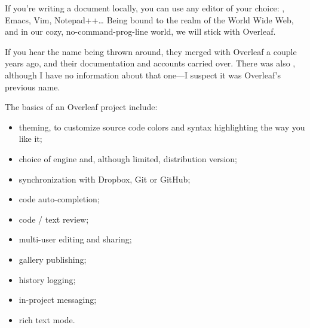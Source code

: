 If you're writing a document locally, you can use any editor of your choice: , Emacs, Vim, Notepad++\ldots{} Being bound to the realm of the World Wide Web, and in our cozy, no-\gls{command-prog}-line world, we will stick with Overleaf.

If you hear the name  being thrown around, they merged with Overleaf a couple years ago, and their documentation and accounts carried over. There was also , although I have no information about that one---I suspect it was Overleaf's previous name.

\noindent The basics of an Overleaf project include:
\begin{itemize}
    \item theming, to customize source code colors and syntax highlighting the way you like it;
    \item choice of engine and, although limited, distribution version;
    \item synchronization with Dropbox, Git or GitHub;
    \item code auto-completion;
    \item code / text review;
    \item multi-user editing and sharing;
    \item gallery publishing;
    \item history logging;
    \item in-project messaging;
    \item rich text mode.
\end{itemize}